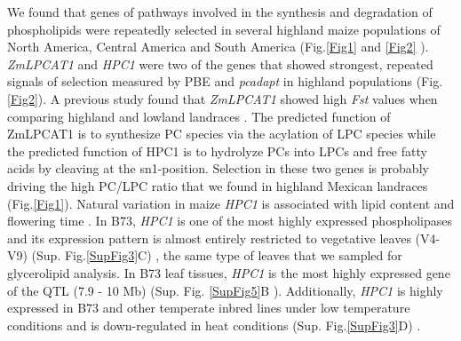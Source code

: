 \documentclass[9pt,twocolumn,twoside,lineno]{BioRxiv}
\begin{document}
We found that genes of pathways involved in the synthesis and degradation of phospholipids were repeatedly selected in several highland maize populations of North America, Central America and South America (Fig.\ref{Fig1} and \ref{Fig2} ). 
\textit{ZmLPCAT1} and \textit{HPC1} were two of the genes that showed strongest, repeated signals of selection measured by PBE and \textit{pcadapt} in highland populations (Fig. \ref{Fig2}). 
A previous study found that \textit{ZmLPCAT1} showed high \textit{Fst} values when comparing highland and lowland landraces \cite{Takuno2015-uj}.
The predicted function of ZmLPCAT1 is to synthesize PC species via the acylation of LPC species while the predicted function of HPC1 is to hydrolyze PCs into LPCs and free fatty acids by cleaving at the sn1-position.
Selection in these two genes is probably driving the high PC/LPC ratio that we found in highland Mexican landraces (Fig.\ref{Fig1}).
Natural variation in maize \textit{HPC1} is associated with lipid content \cite{Riedelsheimer2012-bx} and flowering time \cite{Chen2012-gg, Hung2012-ms}. 
In B73, \textit{HPC1} is one of the most highly expressed phospholipases and its expression pattern is almost entirely restricted to vegetative leaves (V4-V9) (Sup. Fig.\ref{SupFig3}C) \cite{Stelpflug2016-vr}, the same type of leaves that we sampled for glycerolipid analysis. 
In B73 leaf tissues, \textit{HPC1} is the most highly expressed gene of the QTL (7.9 - 10 Mb) (Sup. Fig. \ref{SupFig5}B \cite{Stelpflug2016-vr}).
Additionally, \textit{HPC1} is highly expressed in B73 and other temperate inbred lines under low temperature conditions and is down-regulated in heat conditions (Sup. Fig.\ref{SupFig3}D) \cite{Waters2017-nat}.
\end{document}
